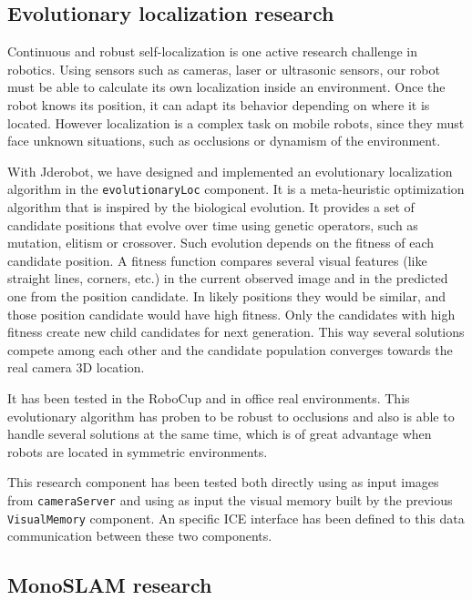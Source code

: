 \documentclass[twocolumn]{svjour3}          %
\begin{document}
\subsection{Evolutionary localization research}

Continuous and robust self-localization is one active research challenge in robotics. Using sensors such as cameras, laser or ultrasonic sensors, our robot must be able to calculate its own localization inside an environment. Once the robot knows its position, it can adapt its behavior depending on where it is located. However localization is a complex task on mobile robots, since they must face unknown situations, such as occlusions or dynamism of the environment. 

With Jderobot, we have designed and implemented an evolutionary localization algorithm \cite{canas2012} in the \texttt{evolutionaryLoc} component. It is a meta-heuristic optimization algorithm that is inspired by the biological evolution. It provides a set of candidate positions that evolve over time using genetic operators, such as mutation, elitism or crossover. Such evolution depends on the fitness of each candidate position. A fitness function compares several visual features (like straight lines, corners, etc.) in the current observed image and in the predicted one from the position candidate. In likely positions they would be similar, and those position candidate would have high fitness. Only the candidates with high fitness create new child candidates for next generation. This way several solutions compete among each other and the candidate population converges towards the real camera 3D location. 

It has been tested in the RoboCup and in office real environments. This evolutionary algorithm has proben to be robust to occlusions and also is able to handle several solutions at the same time, which is of great advantage when robots are located in symmetric environments.  

This research component has been tested both directly using as input images from \texttt{cameraServer} and using as input the visual memory built by the previous \texttt{VisualMemory} component. An specific ICE interface has been defined to this data communication between these two components.

\subsection{MonoSLAM research}
\end{document}
